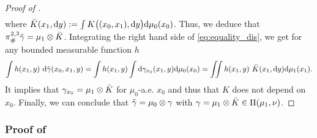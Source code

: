 \documentclass[twoside]{article}
\begin{document}
\begin{proof}[Proof of ]
\begin{equation}
\begin{aligned}
        \end{aligned}
    \end{equation}
    where $\Bar{K}(x_1, \mathrm{d}y):= \int K\big((x_0,x_1), \mathrm{d}y\big)\mathrm{d}\mu_0(x_0)$. Thus, we deduce that $\pi^{2,3}_\#\Tilde{\gamma} = \mu_1 \otimes \Bar{K}$. Integrating the right hand side of \eqref{eq:equality_dis}, we get for any bounded measurable function $h$
    \begin{equation}
        \int h(x_1,y)\ \mathrm{d}\Tilde{\gamma}(x_0,x_1,y) = \int h(x_1,y) \int \mathrm{d}\gamma_{x_0}(x_1,y)\mathrm{d}\mu_0(x_0) = \iint h(x_1,y)\ \Bar{K}(x_1,\mathrm{d}y)\mathrm{d}\mu_1(x_1).
    \end{equation}
    It implies that $\gamma_{x_0} = \mu_1\otimes \Bar{K}$ for $\mu_0$-a.e. $x_0$ and thus that $K$ does not depend on $x_0$. Finally, we can conclude that $\Tilde{\gamma}=\mu_0\otimes \gamma$ with $\gamma = \mu_1 \otimes \Bar{K}\in \Pi(\mu_1,\nu)$.
\end{proof}


\subsubsection{Proof of } \label{proof:prop_busemann_closed_1d}
\end{document}
